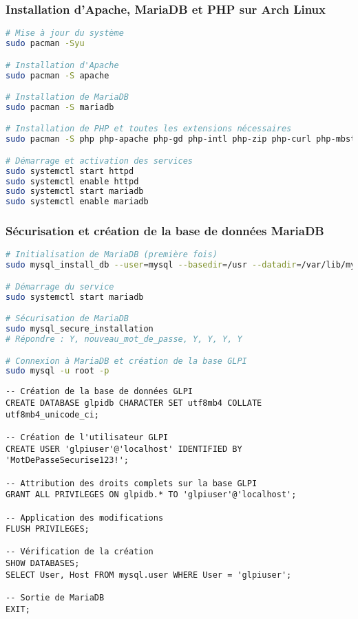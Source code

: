 \documentclass[12pt,a4paper]{article}
\begin{document}
\subsubsection{Installation d'Apache, MariaDB et PHP sur Arch Linux}
\begin{lstlisting}[language=bash, caption=Installation complète de LAMP sur Arch Linux]
# Mise à jour du système
sudo pacman -Syu

# Installation d'Apache
sudo pacman -S apache

# Installation de MariaDB
sudo pacman -S mariadb

# Installation de PHP et toutes les extensions nécessaires
sudo pacman -S php php-apache php-gd php-intl php-zip php-curl php-mbstring php-xml php-mysql php-ldap php-imap php-snmp

# Démarrage et activation des services
sudo systemctl start httpd
sudo systemctl enable httpd
sudo systemctl start mariadb
sudo systemctl enable mariadb
\end{lstlisting}

\subsubsection{Sécurisation et création de la base de données MariaDB}
\begin{lstlisting}[language=bash, caption=Configuration MariaDB pour GLPI]
# Initialisation de MariaDB (première fois)
sudo mysql_install_db --user=mysql --basedir=/usr --datadir=/var/lib/mysql

# Démarrage du service
sudo systemctl start mariadb

# Sécurisation de MariaDB
sudo mysql_secure_installation
# Répondre : Y, nouveau_mot_de_passe, Y, Y, Y, Y

# Connexion à MariaDB et création de la base GLPI
sudo mysql -u root -p
\end{lstlisting}

\begin{lstlisting}[caption=Commandes SQL pour GLPI]
-- Création de la base de données GLPI
CREATE DATABASE glpidb CHARACTER SET utf8mb4 COLLATE utf8mb4_unicode_ci;

-- Création de l'utilisateur GLPI
CREATE USER 'glpiuser'@'localhost' IDENTIFIED BY 'MotDePasseSecurise123!';

-- Attribution des droits complets sur la base GLPI
GRANT ALL PRIVILEGES ON glpidb.* TO 'glpiuser'@'localhost';

-- Application des modifications
FLUSH PRIVILEGES;

-- Vérification de la création
SHOW DATABASES;
SELECT User, Host FROM mysql.user WHERE User = 'glpiuser';

-- Sortie de MariaDB
EXIT;
\end{lstlisting}
\end{document}
